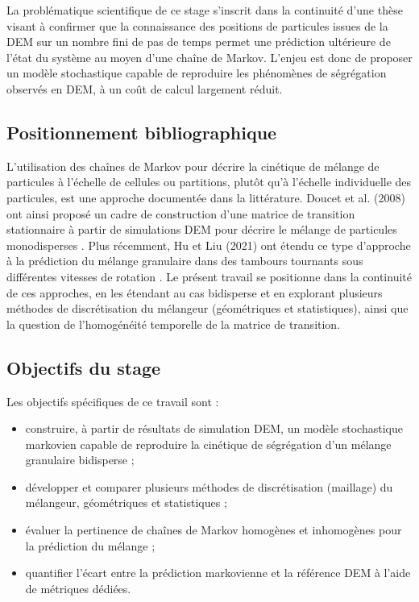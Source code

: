 \documentclass{MemoireMaster}
\begin{document}
La problématique scientifique de ce stage s'inscrit dans la continuité d'une thèse visant à confirmer que la connaissance des positions de particules issues de la DEM sur un nombre fini de pas de temps permet une prédiction ultérieure de l'état du système au moyen d'une chaîne de Markov. L'enjeu est donc de proposer un modèle stochastique capable de reproduire les phénomènes de ségrégation observés en DEM, à un coût de calcul largement réduit.

\subsection{Positionnement bibliographique}
L'utilisation des chaînes de Markov pour décrire la cinétique de mélange de particules à l'échelle de cellules ou partitions, plutôt qu'à l'échelle individuelle des particules, est une approche documentée dans la littérature. Doucet et al. (2008) ont ainsi proposé un cadre de construction d'une matrice de transition stationnaire à partir de simulations DEM pour décrire le mélange de particules monodisperses \cite{doucet2008}. Plus récemment, Hu et Liu (2021) ont étendu ce type d'approche à la prédiction du mélange granulaire dans des tambours tournants sous différentes vitesses de rotation \cite{hu2021}. Le présent travail se positionne dans la continuité de ces approches, en les étendant au cas bidisperse et en explorant plusieurs méthodes de discrétisation du mélangeur (géométriques et statistiques), ainsi que la question de l'homogénéité temporelle de la matrice de transition.

\subsection{Objectifs du stage}
Les objectifs spécifiques de ce travail sont :
\begin{itemize}
\item construire, à partir de résultats de simulation DEM, un modèle stochastique markovien capable de reproduire la cinétique de ségrégation d'un mélange granulaire bidisperse ;
\item développer et comparer plusieurs méthodes de discrétisation (maillage) du mélangeur, géométriques et statistiques ;
\item évaluer la pertinence de chaînes de Markov homogènes et inhomogènes pour la prédiction du mélange ;
\item quantifier l'écart entre la prédiction markovienne et la référence DEM à l'aide de métriques dédiées.
\end{itemize}
\end{document}
